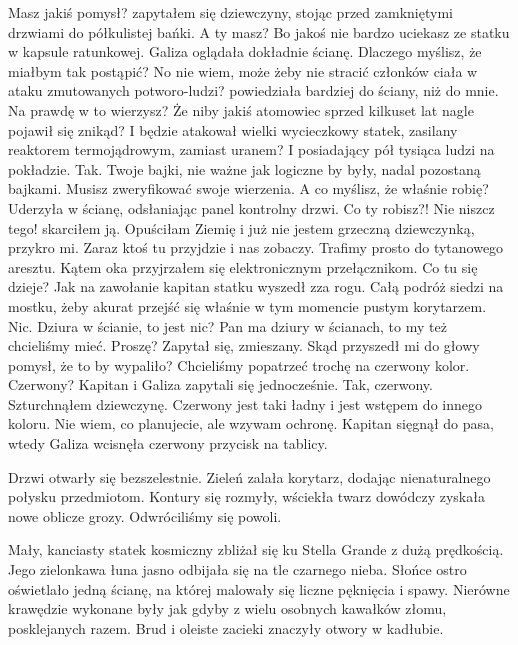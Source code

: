 \begin{dialogue}
	\ds{} Masz jakiś pomysł? \dm{} zapytałem się dziewczyny, stojąc przed zamkniętymi drzwiami do półkulistej bańki.
	\ds{} A ty masz? Bo jakoś nie bardzo uciekasz ze statku w kapsule ratunkowej. \dm{} Galiza oglądała dokładnie ścianę.
	\ds{} Dlaczego myślisz, że miałbym tak postąpić?
	\ds{} No nie wiem, może żeby nie stracić członków ciała w ataku zmutowanych potworo-ludzi? \dm{} powiedziała bardziej do ściany, niż do mnie.
	\ds{} Na prawdę w to wierzysz? Że niby jakiś atomowiec sprzed kilkuset lat nagle pojawił się znikąd? I będzie atakował wielki wycieczkowy statek, zasilany reaktorem termojądrowym, zamiast uranem?
	\ds{} I posiadający pół tysiąca ludzi na pokładzie. Tak.
	\ds{} Twoje bajki, nie ważne jak logiczne by były, nadal pozostaną bajkami. Musisz zweryfikować swoje wierzenia.
	\ds{} A co myślisz, że właśnie robię? \dm{} Uderzyła w ścianę, odsłaniając panel kontrolny drzwi.
	\ds{} Co ty robisz?! Nie niszcz tego! \dm{} skarciłem ją.
	\ds{} Opuściłam Ziemię i już nie jestem grzeczną dziewczynką, przykro mi.
	\ds{} Zaraz ktoś tu przyjdzie i nas zobaczy. Trafimy prosto do tytanowego aresztu. \dm{} Kątem oka przyjrzałem się elektronicznym przełącznikom.
	\ds{} Co tu się dzieje? \dm{} Jak na zawołanie kapitan statku wyszedł zza rogu. Całą podróż siedzi na mostku, żeby akurat przejść się właśnie w tym momencie pustym korytarzem.
	\ds{} Nic.
	\ds{} Dziura w ścianie, to jest nic?
	\ds{} Pan ma dziury w ścianach, to my też chcieliśmy mieć. 
	\ds{} Proszę? \dm{} Zapytał się, zmieszany. Skąd przyszedł mi do głowy pomysł, że to by wypaliło?
	\ds{} Chcieliśmy popatrzeć trochę na czerwony kolor.
	\ds{} Czerwony? \dm{} Kapitan i Galiza zapytali się jednocześnie.
	\ds{} Tak, czerwony. \dm{} Szturchnąłem dziewczynę. \dm{} Czerwony jest taki ładny i jest wstępem do innego koloru.
	\ds{} Nie wiem, co planujecie, ale wzywam ochronę. \dm{} Kapitan sięgnął do pasa, wtedy Galiza wcisnęła czerwony przycisk na tablicy.
\end{dialogue}

Drzwi otwarły się bezszelestnie.
Zieleń zalała korytarz, dodając nienaturalnego połysku przedmiotom.
Kontury się rozmyły, wściekła twarz dowódczy zyskała nowe oblicze grozy.
Odwróciliśmy się powoli.

Mały, kanciasty statek kosmiczny zbliżał się ku Stella Grande z dużą prędkością.
Jego zielonkawa łuna jasno odbijała się na tle czarnego nieba.
Słońce ostro oświetlało jedną ścianę, na której malowały się liczne pęknięcia i spawy.
Nierówne krawędzie wykonane były jak gdyby z wielu osobnych kawałków złomu, posklejanych razem.
Brud i oleiste zacieki znaczyły otwory w kadłubie.

